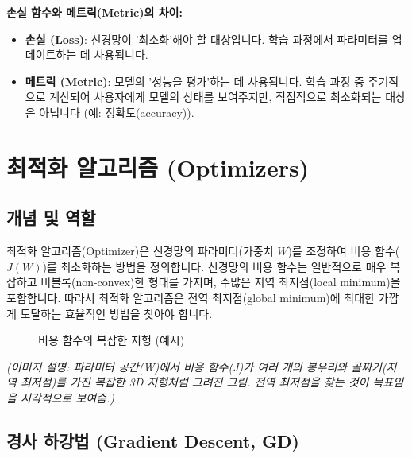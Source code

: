 \documentclass[11pt,a4paper]{book}
\theoremstyle{definition}
\begin{document}
\begin{infobox}
\textbf{손실 함수와 메트릭(Metric)의 차이:}
\begin{itemize}
    \item \textbf{손실 (Loss)}: 신경망이 '최소화'해야 할 대상입니다. 학습 과정에서 파라미터를 업데이트하는 데 사용됩니다.
    \item \textbf{메트릭 (Metric)}: 모델의 '성능을 평가'하는 데 사용됩니다. 학습 과정 중 주기적으로 계산되어 사용자에게 모델의 상태를 보여주지만, 직접적으로 최소화되는 대상은 아닙니다 (예: 정확도(accuracy)).
\end{itemize}
\end{infobox}


\section*{최적화 알고리즘 (Optimizers)}

\subsection*{개념 및 역할}
최적화 알고리즘(Optimizer)은 신경망의 파라미터(가중치 $W$)를 조정하여 비용 함수($J(W)$)를 최소화하는 방법을 정의합니다.
신경망의 비용 함수는 일반적으로 매우 복잡하고 비볼록(non-convex)한 형태를 가지며, 수많은 지역 최저점(local minimum)을 포함합니다.
따라서 최적화 알고리즘은 전역 최저점(global minimum)에 최대한 가깝게 도달하는 효율적인 방법을 찾아야 합니다.

\begin{figure}[h!]
\centering
\caption{비용 함수의 복잡한 지형 (예시)}
\label{fig:cost_landscape}
\end{figure}
\begin{center}
\textit{(이미지 설명: 파라미터 공간(W)에서 비용 함수(J)가 여러 개의 봉우리와 골짜기(지역 최저점)를 가진 복잡한 3D 지형처럼 그려진 그림. 전역 최저점을 찾는 것이 목표임을 시각적으로 보여줌.)}
\end{center}

\subsection*{경사 하강법 (Gradient Descent, GD)}
\end{document}
